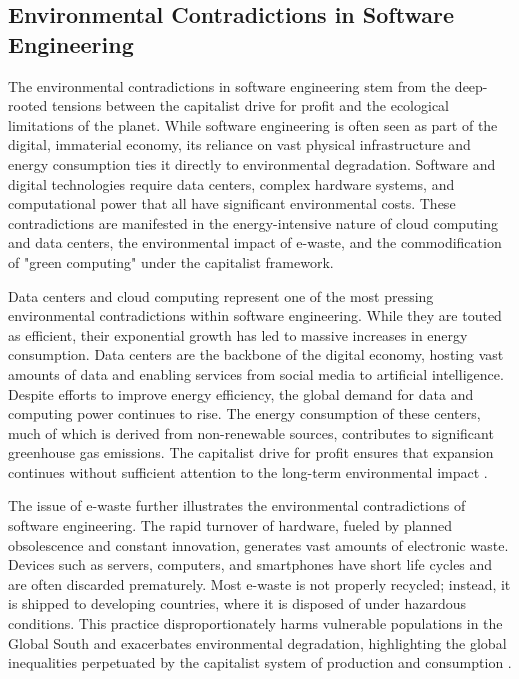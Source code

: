 \begin{refsection}
\section{Environmental Contradictions in Software Engineering}

The environmental contradictions in software engineering stem from the deep-rooted tensions between the capitalist drive for profit and the ecological limitations of the planet. While software engineering is often seen as part of the digital, immaterial economy, its reliance on vast physical infrastructure and energy consumption ties it directly to environmental degradation. Software and digital technologies require data centers, complex hardware systems, and computational power that all have significant environmental costs. These contradictions are manifested in the energy-intensive nature of cloud computing and data centers, the environmental impact of e-waste, and the commodification of "green computing" under the capitalist framework.

Data centers and cloud computing represent one of the most pressing environmental contradictions within software engineering. While they are touted as efficient, their exponential growth has led to massive increases in energy consumption. Data centers are the backbone of the digital economy, hosting vast amounts of data and enabling services from social media to artificial intelligence. Despite efforts to improve energy efficiency, the global demand for data and computing power continues to rise. The energy consumption of these centers, much of which is derived from non-renewable sources, contributes to significant greenhouse gas emissions. The capitalist drive for profit ensures that expansion continues without sufficient attention to the long-term environmental impact \cite[pp.~189-192]{glanz2012}.

The issue of e-waste further illustrates the environmental contradictions of software engineering. The rapid turnover of hardware, fueled by planned obsolescence and constant innovation, generates vast amounts of electronic waste. Devices such as servers, computers, and smartphones have short life cycles and are often discarded prematurely. Most e-waste is not properly recycled; instead, it is shipped to developing countries, where it is disposed of under hazardous conditions. This practice disproportionately harms vulnerable populations in the Global South and exacerbates environmental degradation, highlighting the global inequalities perpetuated by the capitalist system of production and consumption \cite[pp.~62-64]{grossman2006}.


\end{refsection}
